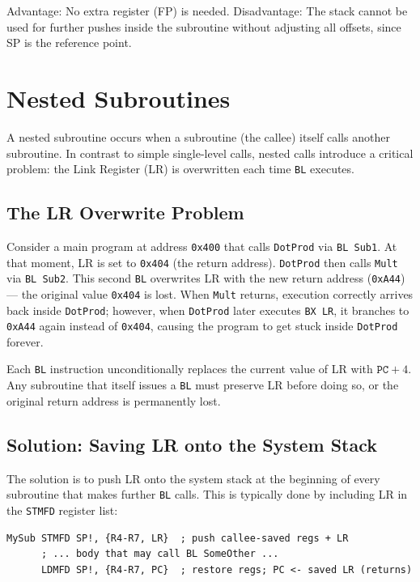 \documentclass[11pt, a4paper, notitlepage]{report}
\theoremstyle{definition}
\theoremstyle{remark}
\theoremstyle{definition}
\begin{document}
Advantage: No extra register (FP) is needed. Disadvantage: The stack cannot be used for further pushes inside the subroutine without adjusting all offsets, since SP is the reference point.

\section{Nested Subroutines}

A nested subroutine occurs when a subroutine (the callee) itself calls another subroutine. In contrast to simple single-level calls, nested calls introduce a critical problem: the Link Register (LR) is overwritten each time \texttt{BL} executes.

\subsection{The LR Overwrite Problem}

Consider a main program at address \texttt{0x400} that calls \texttt{DotProd} via \texttt{BL Sub1}. At that moment, LR is set to \texttt{0x404} (the return address). \texttt{DotProd} then calls \texttt{Mult} via \texttt{BL Sub2}. This second \texttt{BL} overwrites LR with the new return address (\texttt{0xA44}) --- the original value \texttt{0x404} is lost. When \texttt{Mult} returns, execution correctly arrives back inside \texttt{DotProd}; however, when \texttt{DotProd} later executes \texttt{BX LR}, it branches to \texttt{0xA44} again instead of \texttt{0x404}, causing the program to get stuck inside \texttt{DotProd} forever.

\begin{warning}[title={LR is Overwritten by Every BL}]
Each \texttt{BL} instruction unconditionally replaces the current value of LR with $\texttt{PC} + 4$. Any subroutine that itself issues a \texttt{BL} must preserve LR before doing so, or the original return address is permanently lost.
\end{warning}

\subsection{Solution: Saving LR onto the System Stack}

The solution is to push LR onto the system stack at the beginning of every subroutine that makes further \texttt{BL} calls. This is typically done by including LR in the \texttt{STMFD} register list:

\begin{lstlisting}
MySub STMFD SP!, {R4-R7, LR}  ; push callee-saved regs + LR
      ; ... body that may call BL SomeOther ...
      LDMFD SP!, {R4-R7, PC}  ; restore regs; PC <- saved LR (returns)
\end{lstlisting}
\end{document}
